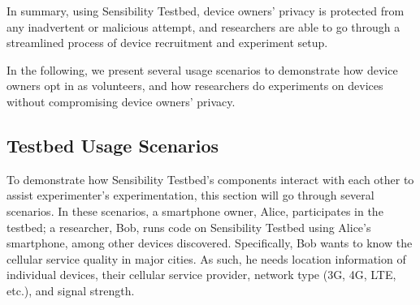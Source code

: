\smallskip
In summary, 
%
%
using Sensibility Testbed, device owners' privacy is protected
from any inadvertent or malicious attempt, and researchers 
are able to go through a streamlined process of device 
recruitment and experiment setup.

In the following, we present several usage scenarios to
demonstrate how device owners opt in as volunteers, and how
researchers do experiments on devices without compromising device
owners' privacy.

\subsection{Testbed Usage Scenarios}\label{sec-scenario}
To demonstrate how Sensibility Testbed's components interact with
each other to assist experimenter's experimentation, this section will go
through several scenarios. In these scenarios, a smartphone owner, Alice,
participates in the testbed; a researcher, Bob, runs code on
Sensibility Testbed using Alice's smartphone, among other
devices discovered. Specifically, Bob wants to know the cellular service
quality in major cities. As such, he needs location information
of individual devices, their cellular service provider, network
type (3G, 4G, LTE, etc.), and signal strength.

